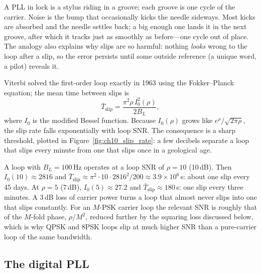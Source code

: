 \begin{analogy}
A PLL in lock is a stylus riding in a groove; each groove is one cycle of the carrier. Noise is
the bump that occasionally kicks the needle sideways. Most kicks are absorbed and the needle
settles back; a big enough one lands it in the next groove, after which it tracks just as
smoothly as before---one cycle out of place. The analogy also explains why slips are so harmful:
nothing \emph{looks} wrong to the loop after a slip, so the error persists until some outside
reference (a unique word, a pilot) reveals it.
\end{analogy}

Viterbi solved the first-order loop exactly in 1963 using the Fokker--Planck equation; the mean
time between slips is
\begin{equation}
\bar T_{\text{slip}}=\frac{\pi^2\rho\,I_0^2(\rho)}{2B_L},
\label{eq:ch10:slip}
\end{equation}
where $I_0$ is the modified Bessel function. Because $I_0(\rho)$ grows like $e^\rho/\sqrt{2\pi\rho}$,
the slip rate falls exponentially with loop SNR. The consequence is a sharp threshold, plotted in
Figure~\ref{fig:ch10_slip_rate}: a few decibels separate a loop that slips every minute from one
that slips once in a geological age.


\begin{worked}
A loop with $B_L=100$\,Hz operates at a loop SNR of $\rho=10$ (10\,dB). Then
$I_0(10)\approx2816$ and $\bar T_{\text{slip}}\approx\pi^2\cdot10\cdot2816^2/200\approx3.9\times10^6$\,s:
about one slip every 45 days. At $\rho=5$ (7\,dB), $I_0(5)\approx27.2$ and
$\bar T_{\text{slip}}\approx180$\,s: one slip every three minutes. A 3\,dB loss of carrier power turns a
loop that almost never slips into one that slips constantly. For an $M$-PSK carrier loop the relevant
SNR is roughly that of the $M$-fold phase, $\rho/M^2$, reduced further by the squaring loss discussed
below, which is why QPSK and 8PSK loops slip at much higher SNR than a pure-carrier loop of the same
bandwidth.
\end{worked}

\subsection{The digital PLL}

